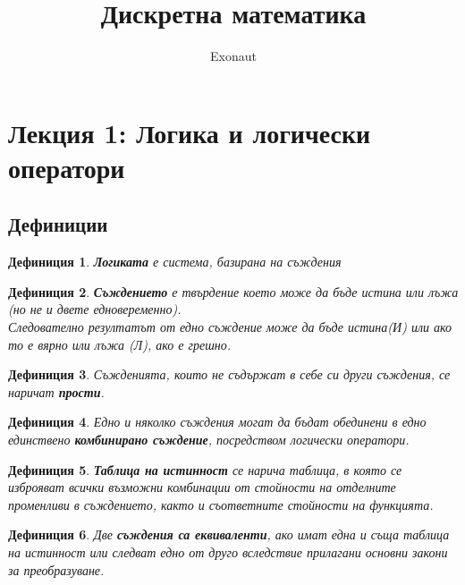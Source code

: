 \documentclass[fleqn, 12pt]{article}
\title{Дискретна математика}
\author{Exonaut}
\newtheorem{definition}{Дефиниция}[subsection]
\begin{document}
\maketitle
{}

\newpage
{}

\tableofcontents
\newpage

\section{Лекция 1: Логика и логически оператори}

\subsection{Дефиниции}

\begin{definition}
\textbf{Логиката} е система, базирана на съждения
\end{definition}

\begin{definition}
\textbf{Съждението} е твърдение което може да бъде истина или лъжа (но не и двете едновеременно).\\
Следователно резултатът от едно съждение може да бъде истина(И) или ако то е вярно или лъжа (Л), ако е грешно.
\end{definition}

\begin{definition}
Съжденията, които не съдържат в себе си други съждения, се наричат \textbf{прости}.
\end{definition}

\begin{definition}
Едно и няколко съждения могат да бъдат обединени в едно единствено \textbf{комбинирано съждение}, посредством логически оператори. 
\end{definition}

\begin{definition}
\textbf{Таблица на истинност} се нарича таблица, в която се изброяват всички възможни комбинации от стойности  на отделните променливи в съждението, както и съответните стойности на функцията. 
\end{definition}

\begin{definition}
Две \textbf{съждения са еквиваленти}, ако имат една и съща таблица на истинност или следват едно от друго вследствие прилагани основни закони за преобразуване. 
\end{definition}
\newpage
\end{document}
